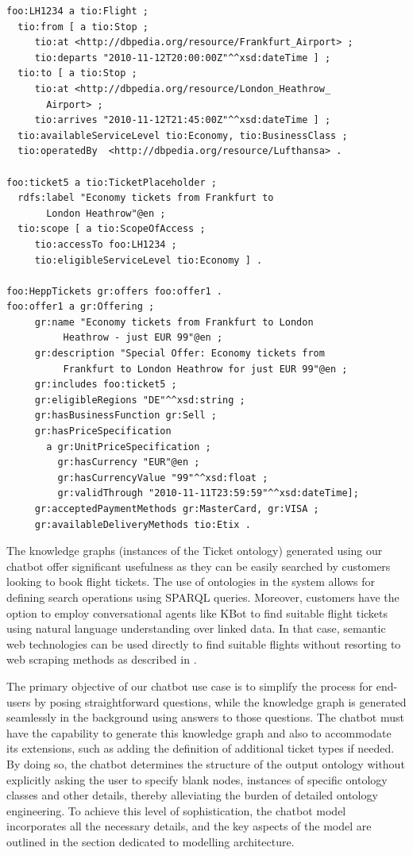 \documentclass[runningheads]{llncs}
\begin{document}
\begin{lstlisting}[basicstyle=\small]
foo:LH1234 a tio:Flight ;
  tio:from [ a tio:Stop ;
     tio:at <http://dbpedia.org/resource/Frankfurt_Airport> ;
     tio:departs "2010-11-12T20:00:00Z"^^xsd:dateTime ] ;
  tio:to [ a tio:Stop ;
     tio:at <http://dbpedia.org/resource/London_Heathrow_
       Airport> ;
     tio:arrives "2010-11-12T21:45:00Z"^^xsd:dateTime ] ;
  tio:availableServiceLevel tio:Economy, tio:BusinessClass ;          
  tio:operatedBy  <http://dbpedia.org/resource/Lufthansa> .
            
foo:ticket5 a tio:TicketPlaceholder ;
  rdfs:label "Economy tickets from Frankfurt to
       London Heathrow"@en ;
  tio:scope [ a tio:ScopeOfAccess ;
     tio:accessTo foo:LH1234 ;
     tio:eligibleServiceLevel tio:Economy ] .

foo:HeppTickets gr:offers foo:offer1 .
foo:offer1 a gr:Offering ;
     gr:name "Economy tickets from Frankfurt to London
          Heathrow - just EUR 99"@en ;
     gr:description "Special Offer: Economy tickets from
          Frankfurt to London Heathrow for just EUR 99"@en ;
     gr:includes foo:ticket5 ;
     gr:eligibleRegions "DE"^^xsd:string ;
     gr:hasBusinessFunction gr:Sell ;
     gr:hasPriceSpecification
       a gr:UnitPriceSpecification ;
         gr:hasCurrency "EUR"@en ;
         gr:hasCurrencyValue "99"^^xsd:float ;
         gr:validThrough "2010-11-11T23:59:59"^^xsd:dateTime];
     gr:acceptedPaymentMethods gr:MasterCard, gr:VISA ;
     gr:availableDeliveryMethods tio:Etix .	
\end{lstlisting}
The knowledge graphs (instances of the Ticket ontology) generated using our chatbot offer significant usefulness as they can be easily searched by customers looking to book flight tickets. The use of ontologies in the system allows for defining search operations using SPARQL queries.
Moreover, customers have the option to employ conversational agents like KBot\cite{ait2020kbot} to find suitable flight tickets using natural language understanding over linked data. In that case, semantic web technologies can be used directly to find suitable flights without resorting to web scraping methods as described in \cite{turnip2019application}.        

The primary objective of our chatbot use case is to simplify the process for end-users by posing straightforward questions, while the knowledge graph is generated seamlessly in the background using answers to those questions. The chatbot must have the capability to generate this knowledge graph and also to accommodate its extensions, such as adding the definition of additional ticket types if needed. By doing so, the chatbot determines the structure of the output ontology without explicitly asking the user to specify blank nodes, instances of specific ontology classes and other details, thereby alleviating the burden of detailed ontology engineering. To achieve this level of sophistication, the chatbot model incorporates all the necessary details, and the key aspects of the model are outlined in the section dedicated to modelling architecture.
\end{document}

